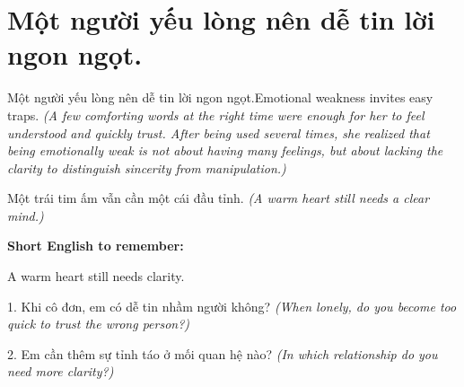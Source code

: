 \section{Một người yếu lòng nên dễ tin lời ngon ngọt.}
\begin{truyen}{Một người yếu lòng nên dễ tin lời ngon ngọt.}{Emotional weakness invites easy traps.}
\textit{(A few comforting words at the right time were enough for her to feel understood and quickly trust. After being used several times, she realized that being emotionally weak is not about having many feelings, but about lacking the clarity to distinguish sincerity from manipulation.)}
\end{truyen}
\begin{baihoc}
Một trái tim ấm vẫn cần một cái đầu tỉnh.
\textit{(A warm heart still needs a clear mind.)}
\end{baihoc}
\begin{ghinhoanh}
\textbf{Short English to remember:}

A warm heart still needs clarity.
\end{ghinhoanh}
\begin{tuhocnhanh}
1. Khi cô đơn, em có dễ tin nhầm người không? \textit{(When lonely, do you become too quick to trust the wrong person?)}

2. Em cần thêm sự tỉnh táo ở mối quan hệ nào? \textit{(In which relationship do you need more clarity?)}
\end{tuhocnhanh}
\ngancach

